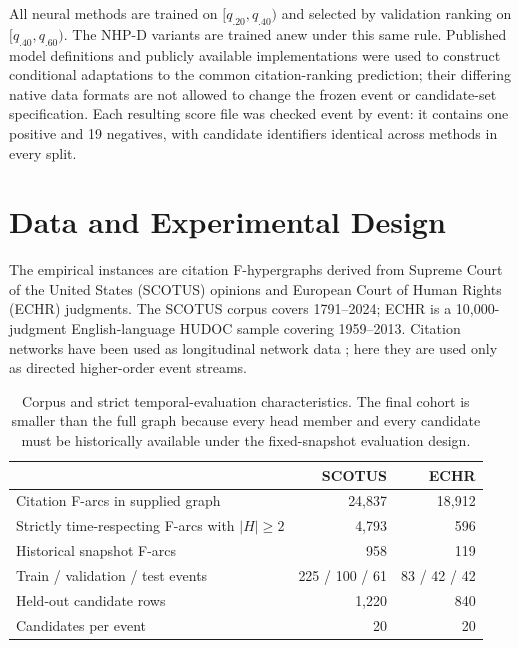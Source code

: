 \documentclass{svproc}
\begin{document}
All neural methods are trained on $[q_{.20},q_{.40})$ and selected by validation ranking on $[q_{.40},q_{.60})$. The NHP-D variants are trained anew under this same rule. Published model definitions and publicly available implementations were used to construct conditional adaptations to the common citation-ranking prediction; their differing native data formats are not allowed to change the frozen event or candidate-set specification. Each resulting score file was checked event by event: it contains one positive and 19 negatives, with candidate identifiers identical across methods in every split.

\section{Data and Experimental Design}
\label{sec:data}

The empirical instances are citation F-hypergraphs derived from Supreme Court of the United States (SCOTUS) opinions and European Court of Human Rights (ECHR) judgments. The SCOTUS corpus covers 1791--2024; ECHR is a 10,000-judgment English-language HUDOC sample covering 1959--2013. Citation networks have been used as longitudinal network data \cite{fowler2007network,lupu2012precedent}; here they are used only as directed higher-order event streams.

\begin{table}[t]
\caption{Corpus and strict temporal-evaluation characteristics. The final cohort is smaller than the full graph because every head member and every candidate must be historically available under the fixed-snapshot evaluation design.}
\label{tab:data}
\centering
\begin{tabular}{lrr}
\toprule
& SCOTUS & ECHR\\
\midrule
Citation F-arcs in supplied graph & 24,837 & 18,912\\
Strictly time-respecting F-arcs with $|H|\geq 2$ & 4,793 & 596\\
Historical snapshot F-arcs & 958 & 119\\
Train / validation / test events & 225 / 100 / 61 & 83 / 42 / 42\\
Held-out candidate rows & 1,220 & 840\\
Candidates per event & 20 & 20\\
\bottomrule
\end{tabular}
\end{table}
\end{document}
